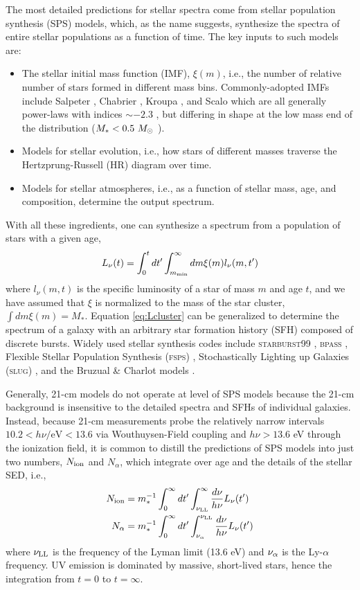 The most detailed predictions for stellar spectra come from stellar population synthesis (SPS) models, which, as the name suggests, synthesize the spectra of entire stellar populations as a function of time. The key inputs to such models are:
\begin{itemize}
	\item The stellar initial mass function (IMF), $\xi(m)$, i.e., the number of relative number of stars formed in different mass bins. Commonly-adopted IMFs include Salpeter \cite{Salpeter1955}, Chabrier \cite{Chabrier2003}, Kroupa \cite{Kroupa2001}, and Scalo \cite{Scalo1998} which are all generally power-laws with indices $\sim -2.3$ , but differing in shape at the low mass end of the distribution ($M_{\ast} < 0.5 \ M_{\odot}$ ).
	\item Models for stellar evolution, i.e., how stars of different masses traverse the Hertzprung-Russell (HR) diagram over time.
	\item Models for stellar atmospheres, i.e., as a function of stellar mass, age, and composition, determine the output spectrum.
\end{itemize}
With all these ingredients, one can synthesize a spectrum from a population of stars with a given age,
\begin{equation}
	L_{\nu}(t) = \int_0^t dt^{\prime} \int_{m_{\text{min}}}^{\infty} dm \xi(m) l_{\nu} (m, t^{\prime}) \label{eq:Lcluster}
\end{equation}
where $l_{\nu}(m, t)$ is the specific luminosity of a star of mass $m$ and age $t$, and we have assumed that $\xi$ is normalized to the mass of the star cluster, $\int dm \xi(m) = M_{\ast}$. Equation \ref{eq:Lcluster} can be generalized to determine the spectrum of a galaxy with an arbitrary star formation history (SFH) composed of discrete bursts. Widely used stellar synthesis codes include \textsc{starburst99} \cite{Leitherer1999}, \textsc{bpass} \cite{Eldridge2009}, Flexible Stellar Population Synthesis (\textsc{fsps}) \cite{Conroy2009}, Stochastically Lighting up Galaxies (\textsc{slug}) \cite{daSilva2012}, and the Bruzual \& Charlot models \cite{Bruzual2003}.

Generally, 21-cm models do not operate at level of SPS models because the 21-cm background is insensitive to the detailed spectra and SFHs of individual galaxies. Instead, because 21-cm measurements probe the relatively narrow intervals $10.2 < h\nu / \mathrm{eV} < 13.6$ via Wouthuysen-Field coupling and $h\nu > 13.6$ eV through the ionization field, it is common to distill the predictions of SPS models into just two numbers, $N_{\text{ion}}$ and $N_{\alpha}$, which integrate over age and the details of the stellar SED, i.e.,
\begin{align}
	N_{\text{ion}} & = m_{\ast}^{-1} \int_0^{\infty} dt^{\prime} \int_{\nu_{\text{LL}}}^{\infty} \frac{d\nu}{h\nu} L_{\nu}(t^{\prime}) \\
	N_{\alpha} & = m_{\ast}^{-1} \int_0^{\infty} dt^{\prime} \int_{\nu_{\alpha}}^{\nu_{\text{LL}}} \frac{d\nu}{h\nu} L_{\nu}(t^{\prime})
\end{align}
where $\nu_{\text{LL}}$ is the frequency of the Lyman limit (13.6 eV) and $\nu_{\alpha}$ is the Ly-$\alpha$ frequency. UV emission is dominated by massive, short-lived stars, hence the integration from $t=0$ to $t=\infty$. 

